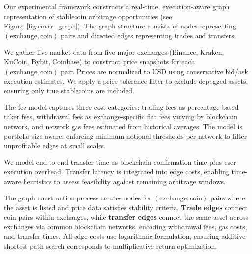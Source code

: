 Our experimental framework constructs a real-time, execution-aware graph representation of stablecoin arbitrage opportunities (see Figure~\ref{fig:cover_graph}). The graph structure consists of nodes representing $(\text{exchange}, \text{coin})$ pairs and directed edges representing trades and transfers.

We gather live market data from five major exchanges (Binance, Kraken, KuCoin, Bybit, Coinbase) to construct price snapshots for each $(\text{exchange}, \text{coin})$ pair. Prices are normalized to USD using conservative bid/ask execution estimates. We apply a price tolerance filter to exclude depegged assets, ensuring only true stablecoins are included.

The fee model captures three cost categories: trading fees as percentage-based taker fees, withdrawal fees as exchange-specific flat fees varying by blockchain network, and network gas fees estimated from historical averages. The model is portfolio-size-aware, enforcing minimum notional thresholds per network to filter unprofitable edges at small scales.

We model end-to-end transfer time as blockchain confirmation time plus user execution overhead. Transfer latency is integrated into edge costs, enabling time-aware heuristics to assess feasibility against remaining arbitrage windows.

The graph construction process creates nodes for $(\text{exchange}, \text{coin})$ pairs where the asset is listed and price data satisfies stability criteria. \textbf{Trade edges} connect coin pairs within exchanges, while \textbf{transfer edges} connect the same asset across exchanges via common blockchain networks, encoding withdrawal fees, gas costs, and transfer times. All edge costs use logarithmic formulation, ensuring additive shortest-path search corresponds to multiplicative return optimization.

